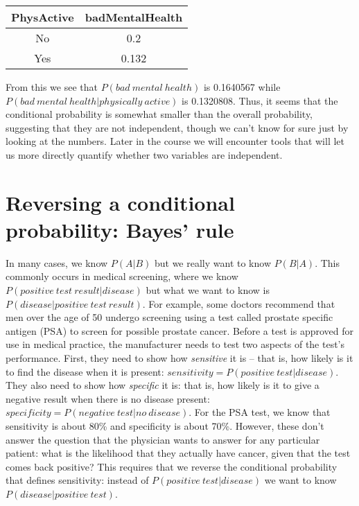 \documentclass[]{book}
\theoremstyle{definition}
\theoremstyle{definition}
\theoremstyle{definition}
\theoremstyle{remark}
\begin{document}
\begin{longtable}[]{@{}cc@{}}
\toprule
\begin{minipage}[b]{0.17\columnwidth}\centering\strut
PhysActive\strut
\end{minipage} & \begin{minipage}[b]{0.22\columnwidth}\centering\strut
badMentalHealth\strut
\end{minipage}\tabularnewline
\midrule
\endhead
\begin{minipage}[t]{0.17\columnwidth}\centering\strut
No\strut
\end{minipage} & \begin{minipage}[t]{0.22\columnwidth}\centering\strut
0.2\strut
\end{minipage}\tabularnewline
\begin{minipage}[t]{0.17\columnwidth}\centering\strut
Yes\strut
\end{minipage} & \begin{minipage}[t]{0.22\columnwidth}\centering\strut
0.132\strut
\end{minipage}\tabularnewline
\bottomrule
\end{longtable}

From this we see that \(P(bad\ mental\ health)\) is 0.1640567 while
\(P(bad\ mental\ health|physically\ active)\) is 0.1320808. Thus, it
seems that the conditional probability is somewhat smaller than the
overall probability, suggesting that they are not independent, though we
can't know for sure just by looking at the numbers. Later in the course
we will encounter tools that will let us more directly quantify whether
two variables are independent.

\section{Reversing a conditional probability: Bayes'
rule}\label{bayestheorem}

In many cases, we know \(P(A|B)\) but we really want to know \(P(B|A)\).
This commonly occurs in medical screening, where we know
\(P(positive\ test\ result|disease)\) but what we want to know is
\(P(disease|positive\ test\ result)\). For example, some doctors
recommend that men over the age of 50 undergo screening using a test
called prostate specific antigen (PSA) to screen for possible prostate
cancer. Before a test is approved for use in medical practice, the
manufacturer needs to test two aspects of the test's performance. First,
they need to show how \emph{sensitive} it is -- that is, how likely is
it to find the disease when it is present:
\(sensitivity = P(positive\ test| disease)\). They also need to show how
\emph{specific} it is: that is, how likely is it to give a negative
result when there is no disease present:
\(specificity = P(negative\ test|no\ disease)\). For the PSA test, we
know that sensitivity is about 80\% and specificity is about 70\%.
However, these don't answer the question that the physician wants to
answer for any particular patient: what is the likelihood that they
actually have cancer, given that the test comes back positive? This
requires that we reverse the conditional probability that defines
sensitivity: instead of \(P(positive\ test| disease)\) we want to know
\(P(disease|positive\ test)\).
\end{document}
